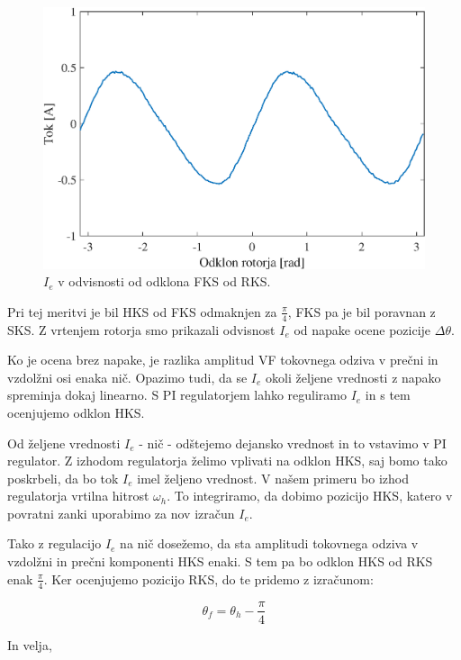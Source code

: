 \documentclass[a4paper,twoside,openright,12pt,slovene]{book}
\begin{document}
\begin{figure}[!htbp]
    \centering
    \includegraphics[width=0.9\columnwidth]{Slike/reguliranaVelicinaIdq0.eps}
    \caption{\label{reguliranaVelicinaIdq0} $I_e$ v odvisnosti od odklona FKS od RKS.}
\end{figure}

Pri tej meritvi je bil HKS od FKS odmaknjen za $\frac{\pi}{4}$, FKS pa je bil poravnan z SKS. Z vrtenjem rotorja smo prikazali odvisnost $I_e$ od napake ocene pozicije $\Delta\theta$. 

Ko je ocena brez napake, je razlika amplitud VF tokovnega odziva v prečni in vzdolžni osi enaka nič. Opazimo tudi, da se $I_e$ okoli željene vrednosti z napako spreminja dokaj linearno. S PI
regulatorjem lahko reguliramo $I_e$ in s tem ocenjujemo odklon HKS.

Od željene vrednosti $I_e$ - nič - odštejemo dejansko vrednost in to vstavimo v PI regulator. Z izhodom regulatorja želimo vplivati na odklon HKS, saj bomo tako poskrbeli, da bo tok $I_e$ imel željeno
vrednost. V našem primeru bo izhod regulatorja vrtilna hitrost $\omega_h$. To integriramo, da dobimo pozicijo HKS, katero v povratni zanki uporabimo za nov izračun $I_e$. 

Tako z regulacijo $I_e$ na nič dosežemo, da sta amplitudi tokovnega odziva v vzdolžni in prečni komponenti HKS enaki. S tem pa bo odklon HKS od RKS enak $\frac{\pi}{4}$. Ker ocenjujemo pozicijo RKS,
do te pridemo z izračunom:

\begin{equation}
    \theta_{f} = \theta_{h} - \frac{\pi}{4}
\end{equation}

In velja,
\end{document}
